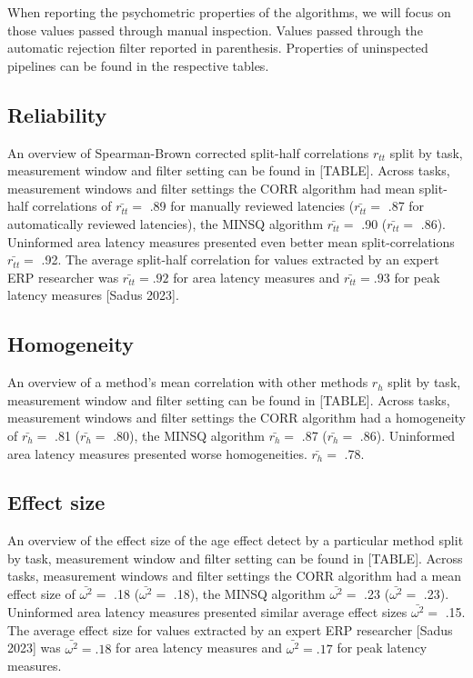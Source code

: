 \documentclass[
  man,floatsintext]{apa7}
\begin{document}
When reporting the psychometric properties of the algorithms, we will focus on those values passed through manual inspection. Values passed through the automatic rejection filter reported in parenthesis. Properties of uninspected pipelines can be found in the respective tables.

\hypertarget{reliability-1}{%
\subsection{Reliability}\label{reliability-1}}

An overview of Spearman-Brown corrected split-half correlations \(r_{tt}\) split by task, measurement window and filter setting can be found in {[}TABLE{]}. Across tasks, measurement windows and filter settings the CORR algorithm had mean split-half correlations of \(\bar{r_{tt}} =\) .89 for manually reviewed latencies (\(\bar{r_{tt}} =\) .87 for automatically reviewed latencies), the MINSQ algorithm \(\bar{r_{tt}} =\) .90 (\(\bar{r_{tt}} =\) .86). Uninformed area latency measures presented even better mean split-correlations \(\bar{r_{tt}} =\) .92. The average split-half correlation for values extracted by an expert ERP researcher was \(\bar{r_{tt}} = .92\) for area latency measures and \(\bar{r_{tt}} = .93\) for peak latency measures {[}Sadus 2023{]}.

\hypertarget{homogeneity-1}{%
\subsection{Homogeneity}\label{homogeneity-1}}

An overview of a method's mean correlation with other methods \(r_h\) split by task, measurement window and filter setting can be found in {[}TABLE{]}. Across tasks, measurement windows and filter settings the CORR algorithm had a homogeneity of \(\bar{r_{h}} =\) .81 (\(\bar{r_{h}} =\) .80), the MINSQ algorithm \(\bar{r_{h}} =\) .87 (\(\bar{r_{h}} =\) .86). Uninformed area latency measures presented worse homogeneities. \(\bar{r_{h}} =\) .78.

\hypertarget{effect-size-1}{%
\subsection{Effect size}\label{effect-size-1}}

An overview of the effect size of the age effect detect by a particular method split by task, measurement window and filter setting can be found in {[}TABLE{]}. Across tasks, measurement windows and filter settings the CORR algorithm had a mean effect size of \(\bar{\omega^2} =\) .18 (\(\bar{\omega^2} =\) .18), the MINSQ algorithm \(\bar{\omega^2} =\) .23 (\(\bar{\omega^2} =\) .23). Uninformed area latency measures presented similar average effect sizes \(\bar{\omega^2} =\) .15. The average effect size for values extracted by an expert ERP researcher {[}Sadus 2023{]} was \(\bar{\omega^2} = .18\) for area latency measures and \(\bar{\omega^2} = .17\) for peak latency measures.
\end{document}
